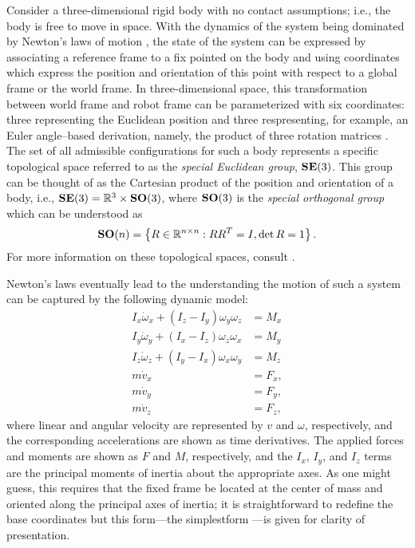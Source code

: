 Consider a three-dimensional rigid body with no contact assumptions; i.e., the body is free to move in space.
%
With the dynamics of the system being dominated by Newton's laws of motion \cite{feynman1963}, the state of the system can be expressed by associating a reference frame to a fix pointed on the body and using coordinates which express the position and orientation of this point with respect to a global frame or the world frame.
%
In three-dimensional space, this transformation between world frame and robot frame can be parameterized with six coordinates: three representing the Euclidean position and three respresenting, for example, an Euler angle--based derivation, namely, the product of three rotation matrices \cite{Baruh98}.
%
The set of all admissible configurations for such a body represents a specific topological space referred to as the {\em special Euclidean group}, $\mathbf{SE}(3)$.
%
This group can be thought of as the Cartesian product of the position and orientation of a body, i.e., $\mathbf{SE}(3) = \mathbb{R}^3 \times \mathbf{SO}(3)$, where $\mathbf{SO}(3)$ is the {\em special orthogonal group} which can be understood as
\begin{align*}
  \mathbf{SO}(n) = \left\{ R \in \mathbb{R}^{n \times n} : R R^T = I, \det R = 1 \right\}.
\end{align*}
For more information on these topological spaces, consult \cite{MLS94}.


Newton's laws eventually lead to the understanding the motion of such a system can be captured by the following dynamic model:
\begin{align}
  \nonumber
  I_{x} \dot{\omega}_{x} + (I_{z} - I_{y}) \omega_{y} \omega_{z} &= M_{x}\\
  \nonumber
  I_{y} \dot{\omega}_{y} + (I_{x} - I_{z}) \omega_{z} \omega_{x} &= M_{y}\\
  \nonumber
  I_{z} \dot{\omega}_{z} + (I_{y} - I_{x}) \omega_{x} \omega_{y} &= M_{z}\\
  \nonumber
  m \dot{v}_{x} &= F_{x},\\
  \nonumber
  m \dot{v}_{y} &= F_{y},\\
  m \dot{v}_{z} &= F_{z},
\end{align}
where linear and angular velocity are represented by $v$ and $\omega$, respectively, and the corresponding accelerations are shown as time derivatives.
%
The applied forces and moments are shown as $F$ and $M$, respectively, and the $I_{x}$, $I_{y}$, and $I_{z}$ terms are the principal moments of inertia about the appropriate axes.
%
As one might guess, this requires that the fixed frame be located at the center of mass and oriented along the principal axes of inertia; it is straightforward to redefine the base coordinates but this form---the simplestform ---is given for clarity of presentation.


